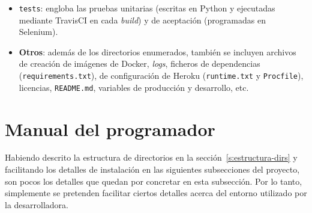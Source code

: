 \begin{itemize}
	\item \texttt{tests}: engloba las pruebas unitarias (escritas en Python y ejecutadas mediante TravisCI en cada \textit{build}) y de aceptación (programadas en Selenium).
	
	\item \textbf{Otros}: además de los directorios enumerados, también se incluyen archivos de creación de imágenes de Docker, \textit{logs}, ficheros de dependencias (\texttt{requirements.txt}), de configuración de Heroku (\texttt{runtime.txt} y \texttt{Procfile}), licencias, \texttt{README.md}, variables de producción y desarrollo, etc.
\end{itemize}



\section{Manual del programador}
\label{s:man-prog}

Habiendo descrito la estructura de directorios en la sección~\ref{s:estructura-dirs} y facilitando los detalles de instalación en las siguientes subsecciones del proyecto, son pocos los detalles que quedan por concretar en esta subsección. Por lo tanto, simplemente se pretenden facilitar ciertos detalles acerca del entorno utilizado por la desarrolladora.

